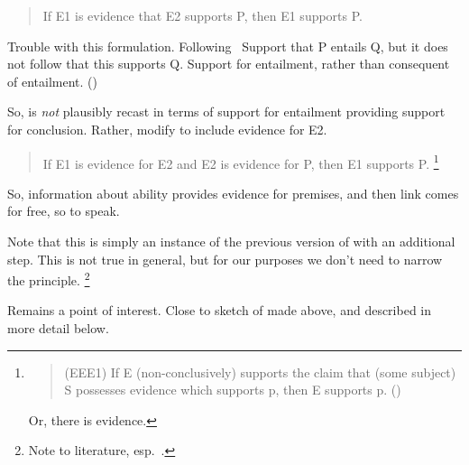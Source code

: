 \begin{note}
  \begin{quote}
    If E1 is evidence that E2 supports P, then E1 supports P.
  \end{quote}

  Trouble with this formulation.
  Following~\citeauthor{Feldman:2014un}
  Support that P entails Q, but it does not follow that this supports Q.
  Support for entailment, rather than consequent of entailment.
  (\citeyear[291]{Feldman:2014un})

  So, \AR{} is \emph{not} plausibly recast in terms of support for entailment providing support for conclusion.
  Rather, modify to include evidence for E2.

  \begin{quote}
    If E1 is evidence for E2 and E2 is evidence for P, then E1 supports P.\nolinebreak
    \footnote{
      \begin{quote}
        (EEE1) If E (non-conclusively) supports the claim that (some subject) S possesses evidence which supports p, then E supports p.\nolinebreak
        \mbox{}\hfill\mbox{(\citeyear[4]{Tal:2017uw})}
      \end{quote}
      Or, there is evidence.
    }
  \end{quote}

  So, information about ability provides evidence for premises, and then link comes for free, so to speak.

  Note that this is simply an instance of the previous version of \AR{} with an additional step.
  This is not true in general, but for our purposes we don't need to narrow the principle.\nolinebreak
  \footnote{
    Note to literature, esp.\ \citeauthor{Tal:2017uw}.
  }

  Remains a point of interest.
  Close to sketch of \WR{} made above, and described in more detail below.
\end{note}

